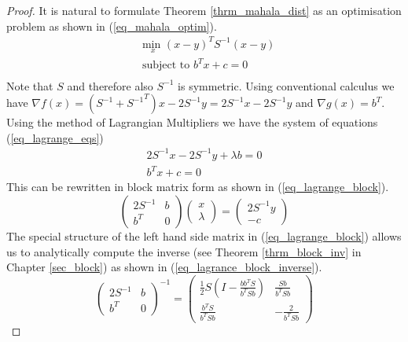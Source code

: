 \begin{proof}
It is natural to formulate Theorem \ref{thrm_mahala_dist} as an optimisation problem as shown in (\ref{eq_mahala_optim}). \begin{equation}
\begin{aligned}
&\underset{x}{\text{min }} (x-y)^TS^{-1}(x-y)\\
& \text{subject to } b^Tx+c = 0\\
\end{aligned}
\label{eq_mahala_optim}
\end{equation}
Note that $S$ and therefore also $S^{-1}$ is symmetric. Using conventional calculus we have $\nabla f(x) = (S^{-1} + {S^{-1}}^T)x - 2S^{-1}y = 2S^{-1}x - 2S^{-1}y$ and $\nabla g(x) = b^T$. Using the method of Lagrangian Multipliers \cite{forst} we have the system of equations (\ref{eq_lagrange_eqs})
\begin{equation}
\begin{aligned}
2S^{-1}x - 2S^{-1}y + \lambda b = 0 \\
b^Tx+c = 0
\end{aligned}
\label{eq_lagrange_eqs}
\end{equation}
This can be rewritten in block matrix form as shown in (\ref{eq_lagrange_block}).
\begin{equation}
\begin{pmatrix}
2S^{-1} & b \\ b^T & 0
\end{pmatrix} \begin{pmatrix}
x \\ \lambda
\end{pmatrix} = \begin{pmatrix}
2S^{-1}y \\ -c
\end{pmatrix}
\label{eq_lagrange_block}
\end{equation}
The special structure of the left hand side matrix in (\ref{eq_lagrange_block}) allows us to analytically compute the inverse (see Theorem \ref{thrm_block_inv} in Chapter \ref{sec_block}) as shown in (\ref{eq_lagrance_block_inverse}).
\begin{equation}
\begin{pmatrix}
2S^{-1} & b \\ b^T & 0
\end{pmatrix}^{-1} = \begin{pmatrix}
\frac{1}{2}S(I-\frac{bb^TS}{b^TSb}) & \frac{Sb}{b^TSb} \\ \frac{b^TS}{b^TSb} & -\frac{2}{b^TSb}

\end{pmatrix}
\end{equation}
\end{proof}

